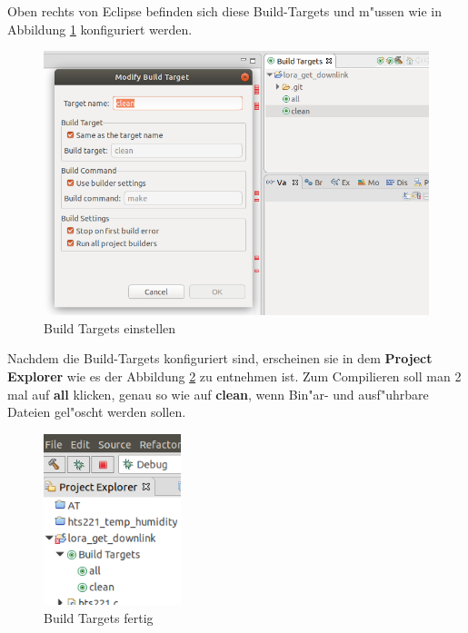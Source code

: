 Oben rechts von Eclipse befinden sich diese Build-Targets und m"ussen wie in Abbildung \ref{fig:build} konfiguriert werden.

\begin{figure}[h]
	\centering
	\includegraphics[width=13cm]{source/images/Build}
	\caption{Build Targets einstellen\label{fig:build}}
\end{figure}

Nachdem die Build-Targets konfiguriert sind, erscheinen sie in dem 
\textbf{Project Explorer} wie es der Abbildung \ref{fig:build2} zu 
entnehmen ist. Zum Compilieren soll man 2 mal auf \textbf{all} klicken, 
genau so wie auf \textbf{clean}, wenn Bin"ar- und ausf"uhrbare Dateien 
gel"oscht werden sollen. 

\begin{figure}[h]
	\centering
	\includegraphics[width=4cm]{source/images/Build2}
	\caption{Build Targets fertig\label{fig:build2}}
\end{figure}

